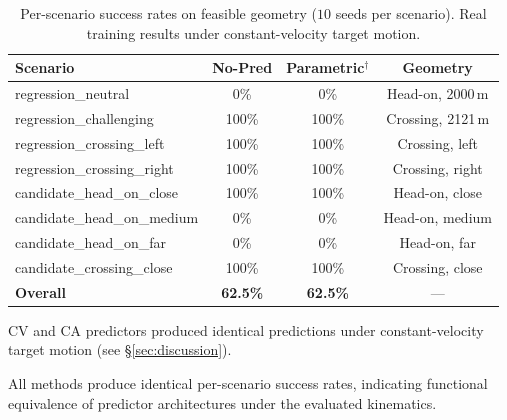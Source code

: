 \begin{table}[t]
\centering
\caption{Per-scenario success rates on feasible geometry ($10$ seeds per scenario). Real training results under constant-velocity target motion.}
\label{tab:per_scenario}
\begin{tabular}{lccc}
\toprule
Scenario & No-Pred & Parametric$^\dagger$ & Geometry \\
\midrule
regression\_neutral & 0\% & 0\% & Head-on, 2000\,m \\
regression\_challenging & 100\% & 100\% & Crossing, 2121\,m \\
regression\_crossing\_left & 100\% & 100\% & Crossing, left \\
regression\_crossing\_right & 100\% & 100\% & Crossing, right \\
candidate\_head\_on\_close & 100\% & 100\% & Head-on, close \\
candidate\_head\_on\_medium & 0\% & 0\% & Head-on, medium \\
candidate\_head\_on\_far & 0\% & 0\% & Head-on, far \\
candidate\_crossing\_close & 100\% & 100\% & Crossing, close \\
\midrule
\textbf{Overall} & \textbf{62.5\%} & \textbf{62.5\%} & --- \\
\bottomrule
\end{tabular}
\begin{tablenotes}
\small
\item[$^\dagger$] CV and CA predictors produced identical predictions under 
  constant-velocity target motion (see \S\ref{sec:discussion}).
\item All methods produce identical per-scenario success rates, indicating functional 
  equivalence of predictor architectures under the evaluated kinematics.
\end{tablenotes}
\end{table}
